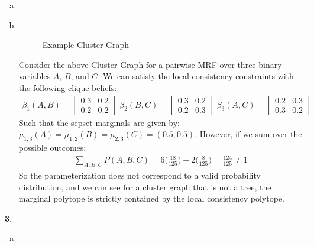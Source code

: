 \documentclass{article}
\begin{document}
\begin{enumerate}[(a)]
    \item 
    \item \textcolor{white}{{x}}
    \begin{figure}[th]
        \centering
        \caption{Example Cluster Graph}
        \label{fig:bethe-cluster-graph}
    \end{figure}

    Consider the above Cluster Graph for a pairwise MRF over three binary variables $A$, $B$, and $C$. We can satisfy the local consistency constraints with the following clique beliefs: 
\begin{gather*}
            \beta_{1}(A, B) =
            \begin{bmatrix}
                0.3 & 0.2\\ 0.2 & 0.2
            \end{bmatrix} \;
\beta_{2}(B, C) =
            \begin{bmatrix}
                0.3 & 0.2\\ 0.2 & 0.3
            \end{bmatrix}\;
\beta_{3}(A, C) =
            \begin{bmatrix}
                0.2 & 0.3 \\ 0.3 & 0.2
            \end{bmatrix}
    \end{gather*}
    Such that the sepset marginals are given by: $\mu_{1,3}(A) = \mu_{1,2}(B) = \mu_{2,3}(C) = (0.5, 0.5)$. However, if we sum over the possible outcomes: \begin{align*}
        \sum_{A, B, C} P(A, B, C) = 6 \bigg(\frac{18}{125}\bigg) + 2 \bigg(\frac{8}{125}\bigg) = \frac{124}{125} \neq 1
    \end{align*}
    So the parameterization does not correspond to a valid probability distribution, and we can see for a cluster graph that is not a tree, the marginal polytope is strictly contained by the local consistency polytope. 
\end{enumerate}


\textbf{3.} \begin{enumerate}[(a)]
    \item 
\end{enumerate}
\end{document}
